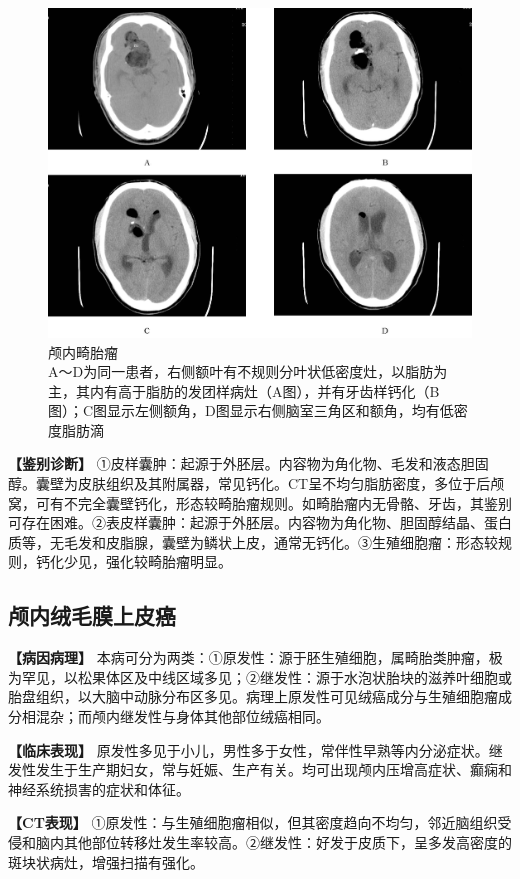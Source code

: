 \begin{figure}[!htbp]
 \centering
 \includegraphics[width=.7\textwidth,height=\textheight,keepaspectratio]{./images/Image00072.jpg}
 \captionsetup{justification=centering}
 \caption{颅内畸胎瘤\\{\small A～D为同一患者，右侧额叶有不规则分叶状低密度灶，以脂肪为主，其内有高于脂肪的发团样病灶（A图），并有牙齿样钙化（B图）；C图显示左侧额角，D图显示右侧脑室三角区和额角，均有低密度脂肪滴}}
 \label{fig2-43}
  \end{figure} 

\textbf{【鉴别诊断】}
①皮样囊肿：起源于外胚层。内容物为角化物、毛发和液态胆固醇。囊壁为皮肤组织及其附属器，常见钙化。CT呈不均匀脂肪密度，多位于后颅窝，可有不完全囊壁钙化，形态较畸胎瘤规则。如畸胎瘤内无骨骼、牙齿，其鉴别可存在困难。②表皮样囊肿：起源于外胚层。内容物为角化物、胆固醇结晶、蛋白质等，无毛发和皮脂腺，囊壁为鳞状上皮，通常无钙化。③生殖细胞瘤：形态较规则，钙化少见，强化较畸胎瘤明显。

\subsection{颅内绒毛膜上皮癌}

\textbf{【病因病理】}
本病可分为两类：①原发性：源于胚生殖细胞，属畸胎类肿瘤，极为罕见，以松果体区及中线区域多见；②继发性：源于水泡状胎块的滋养叶细胞或胎盘组织，以大脑中动脉分布区多见。病理上原发性可见绒癌成分与生殖细胞瘤成分相混杂；而颅内继发性与身体其他部位绒癌相同。

\textbf{【临床表现】}
原发性多见于小儿，男性多于女性，常伴性早熟等内分泌症状。继发性发生于生产期妇女，常与妊娠、生产有关。均可出现颅内压增高症状、癫痫和神经系统损害的症状和体征。

\textbf{【CT表现】}
①原发性：与生殖细胞瘤相似，但其密度趋向不均匀，邻近脑组织受侵和脑内其他部位转移灶发生率较高。②继发性：好发于皮质下，呈多发高密度的斑块状病灶，增强扫描有强化。

